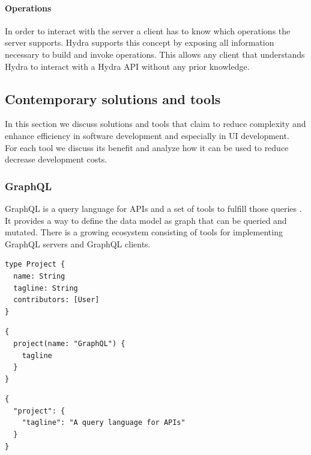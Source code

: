 \paragraph{Operations}
In order to interact with the server a client has to know which operations the server supports. Hydra supports this concept by exposing all information necessary to build and invoke operations. This allows any client that understands Hydra to interact with a Hydra API without any prior knowledge.

\subsection{Contemporary solutions and tools}
In this section we discuss solutions and tools that claim to reduce complexity and enhance efficiency in software development and especially in UI development. \\ For each tool we discuss its benefit and analyze how it can be used to reduce decrease development costs.

\subsubsection{GraphQL}
GraphQL is a query language for APIs and a set of tools to fulfill those queries \citep{graphql}. It provides a way to define the data model as graph that can be queried and mutated. There is a growing ecosystem consisting of tools for implementing GraphQL servers and GraphQL clients.

\lstset{language=GraphQL}
\begin{lstlisting}[caption=Simple data model in the GraphQL data description language.]
type Project {
  name: String
  tagline: String
  contributors: [User]
}
\end{lstlisting}
\lstset{language=GraphQL}
\begin{lstlisting}[caption=Example of a GraphQL query to fetch the tagline of a certain project.]
{
  project(name: "GraphQL") {
    tagline
  }
}
\end{lstlisting}
\lstset{language=JSON}
\begin{lstlisting}[caption=Response of the GraphQL server in JSON.]
{
  "project": {
    "tagline": "A query language for APIs"
  }
}\end{lstlisting}

